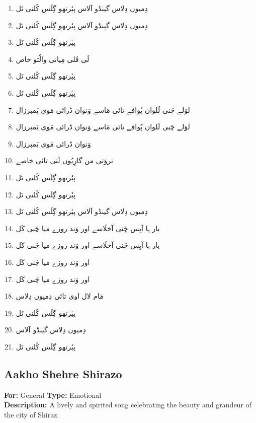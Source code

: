 \documentclass[12pt]{article}
\newcommand{\bigarabic}[1]{\fontsize{16pt}{18pt}\selectfont \textarabic{#1}}
\begin{document}
\begin{multicols}{2}
\begin{RTL}
\begin{enumerate}[leftmargin=*, label=\arabic*., font=\fontsize{16pt}{18pt}\selectfont]
  \item \bigarabic{دِمیوں دِلاس گینڈو آلاس پیٔرتھو گِلَس کُلنی تَل}
  \item \bigarabic{دِمیوں دِلاس گینڈو آلاس پیٔرتھو گِلَس کُلنی تَل}
  \item \bigarabic{پیٔرتھو گِلَس کُلنی تَل}
  \item \bigarabic{لَی فَلی مِیانی والْتو خاص}
  \item \bigarabic{پیٔرتھو گِلَس کُلنی تَل}
  \item \bigarabic{پیٔرتھو گِلَس کُلنی تَل}
  \item \bigarabic{لوَلے چَنی لَلوان پُوافے تائی مَاسے وَنوان ڈرائی مَوی یَمبرزال}
  \item \bigarabic{لوَلے چَنی لَلوان پُوافے تائی مَاسے وَنوان ڈرائی مَوی یَمبرزال}
  \item \bigarabic{وَنوان ڈرائی مَوی یَمبرزال}
  \item \bigarabic{تروَتی من گارِیُوں لَتی تائی خاصے}
  \item \bigarabic{پیٔرتھو گِلَس کُلنی تَل}
  \item \bigarabic{پیٔرتھو گِلَس کُلنی تَل}
  \item \bigarabic{دِمیوں دِلاس گینڈو آلاس پیٔرتھو گِلَس کُلنی تَل}
  \item \bigarabic{یار ہا آیِس چَنی آخلَاسے اور وَند روزے میا چَنی کَل}
  \item \bigarabic{یار ہا آیِس چَنی آخلَاسے اور وَند روزے میا چَنی کَل}
  \item \bigarabic{اور وَند روزے میا چَنی کَل}
  \item \bigarabic{اور وَند روزے میا چَنی کَل}
  \item \bigarabic{مَام لال اوی تائی دِمیوں دِلاس}
  \item \bigarabic{پیٔرتھو گِلَس کُلنی تَل}
  \item \bigarabic{دِمیوں دِلاس گینڈو آلاس}
  \item \bigarabic{پیٔرتھو گِلَس کُلنی تَل}
\end{enumerate}
\end{RTL}
\end{multicols}


\subsection*{Aakho Shehre Shirazo}
\textbf{For:} General \quad \textbf{Type:} Emotional\\
\textbf{Description:} A lively and spirited song celebrating the beauty and grandeur of the city of Shiraz.
\end{document}
